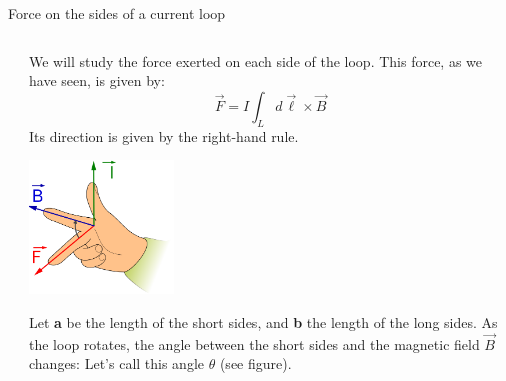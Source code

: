 \begin{frame}{Force on the sides of a current loop}
\begin{columns}
\begin{column}{0.37\textwidth}
  \end{column}
  \begin{column}{0.63\textwidth}
  {\small
    We will study the force exerted on each side of the loop.
    This force, as we have seen, is given by:
    \begin{equation*}
        \vec{F} = I \int_{L} d\vec{\ell} \times \vec{B}
    \end{equation*}
    \vspace{0.1cm}
    Its direction is given by the right-hand rule.\\
    \begin{center}
      \includegraphics[width=0.30\textwidth]{./images/schematics/right_hand_rule_fbi.png}\\
    \end{center}
    Let {\bf a} be the length of the short sides, and {\bf b} the length of the long sides.
    As the loop rotates, the angle between the short sides and the magnetic field $\vec{B}$ changes:
    Let's call this angle $\theta$ (see figure).\\
  }
  \end{column}
\end{columns}

\end{frame}


%
%
%


